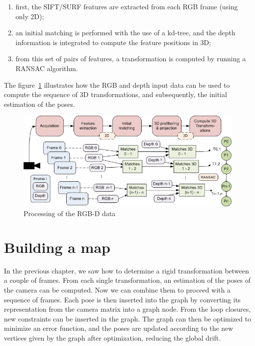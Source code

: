 \begin{enumerate}
\item first, the \gls{SIFT}/\gls{SURF} features are extracted from each RGB frame (using only 2D);
\item an initial matching is performed with the use of a kd-tree, and the depth information is integrated to compute the feature positions in 3D;
\item from this set of pairs of features, a transformation is computed by running a \gls{RANSAC} algorithm.
\end{enumerate}

The figure~\ref{fig:system_overview_rgb_depth} illustrates how the RGB and depth input data can be used to compute the sequence of 3D transformations, and subsequently, the initial estimation of the poses.

\begin{figure}[H]
\centering
\includegraphics[width=1.0\textwidth]{figures/overview_rgb_depth}
\caption{Processing of the RGB-D data}
\label{fig:system_overview_rgb_depth}
\end{figure}

\chapter{Building a map}
\label{chap:map}

In the previous chapter, we saw how to determine a rigid transformation between a couple of frames. From each single transformation, an estimation of the poses of the camera can be computed. Now we can combine them to proceed with a sequence of frames. Each pose is then inserted into the graph by converting its representation from the camera matrix into a graph node. From the loop closures, new constraints can be inserted in the graph. The graph can then be optimized to minimize an error function, and the poses are updated according to the new vertices given by the graph after optimization, reducing the global drift.


